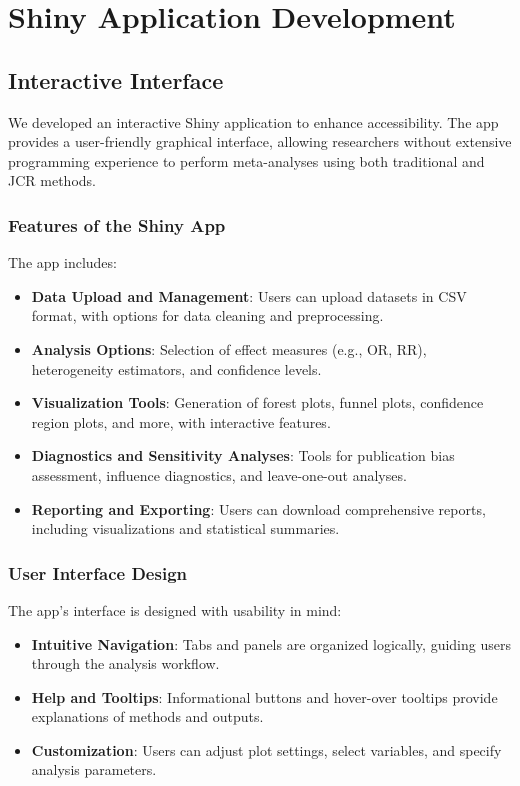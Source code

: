 \documentclass[12pt,a4paper]{report}
\begin{document}
\chapter{Shiny Application Development}
\label{chap:shiny_app}

\section{Interactive Interface}
\label{sec:interactive_interface}

We developed an interactive Shiny application to enhance accessibility. The app provides a user-friendly graphical interface, allowing researchers without extensive programming experience to perform meta-analyses using both traditional and JCR methods.

\subsection{Features of the Shiny App}
\label{subsec:shiny_features}

The app includes:

\begin{itemize}
    \item \textbf{Data Upload and Management}: Users can upload datasets in CSV format, with options for data cleaning and preprocessing.
    \item \textbf{Analysis Options}: Selection of effect measures (e.g., OR, RR), heterogeneity estimators, and confidence levels.
    \item \textbf{Visualization Tools}: Generation of forest plots, funnel plots, confidence region plots, and more, with interactive features.
    \item \textbf{Diagnostics and Sensitivity Analyses}: Tools for publication bias assessment, influence diagnostics, and leave-one-out analyses.
    \item \textbf{Reporting and Exporting}: Users can download comprehensive reports, including visualizations and statistical summaries.
\end{itemize}

\subsection{User Interface Design}
\label{subsec:ui_design}

The app's interface is designed with usability in mind:

\begin{itemize}
    \item \textbf{Intuitive Navigation}: Tabs and panels are organized logically, guiding users through the analysis workflow.
    \item \textbf{Help and Tooltips}: Informational buttons and hover-over tooltips provide explanations of methods and outputs.
    \item \textbf{Customization}: Users can adjust plot settings, select variables, and specify analysis parameters.
\end{itemize}
\end{document}
